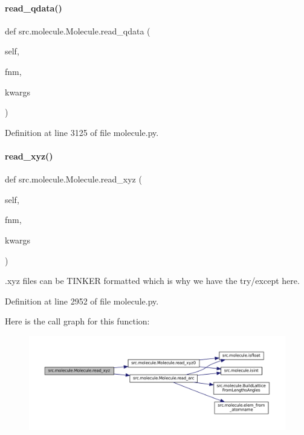 \paragraph{\texorpdfstring{read\+\_\+qdata()}{read\_qdata()}}
{\footnotesize\ttfamily def src.\+molecule.\+Molecule.\+read\+\_\+qdata (\begin{DoxyParamCaption}\item[{}]{self,  }\item[{}]{fnm,  }\item[{}]{kwargs }\end{DoxyParamCaption})}



Definition at line 3125 of file molecule.\+py.

\mbox{\label{classsrc_1_1molecule_1_1Molecule_a36a4504f013d86188435e01231235386}} 
\paragraph{\texorpdfstring{read\+\_\+xyz()}{read\_xyz()}}
{\footnotesize\ttfamily def src.\+molecule.\+Molecule.\+read\+\_\+xyz (\begin{DoxyParamCaption}\item[{}]{self,  }\item[{}]{fnm,  }\item[{}]{kwargs }\end{DoxyParamCaption})}



.xyz files can be T\+I\+N\+K\+ER formatted which is why we have the try/except here. 



Definition at line 2952 of file molecule.\+py.

Here is the call graph for this function\+:
\nopagebreak
\begin{figure}[H]
\begin{center}
\leavevmode
\includegraphics[width=350pt]{classsrc_1_1molecule_1_1Molecule_a36a4504f013d86188435e01231235386_cgraph}
\end{center}
\end{figure}
\mbox{\label{classsrc_1_1molecule_1_1Molecule_a4b84ec657b8c89c34674bb205f7eb1b2}} 
